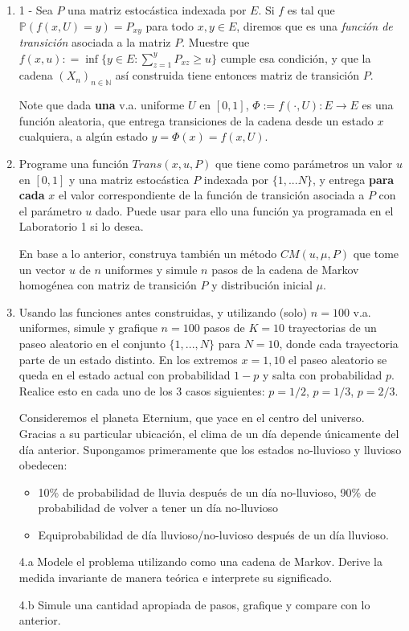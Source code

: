 \begin{enumerate}
    \item  1 - Sea $P$ una matriz estocástica  indexada por $E$. Si	$f$ es tal que $ \mathbb{P}(f(x,U)=y)= P_{xy} $ para todo $x,y\in E$, diremos que es una  \textit{función de transición} asociada a la matriz $P$. Muestre que $f(x,u): = \inf \{y\in E : \sum_{z=1}^y P_{xz}\geq u\}$ cumple esa condición, y que   la cadena $(X_n)_{n\in\mathbb{N}}$  así  construida tiene entonces matriz de transición $P$.

    Note que dada \textbf{una} v.a. uniforme $U$ en $[0,1]$, $\Phi:= f(\cdot,  U):E \rightarrow E$  es una función aleatoria,  que entrega transiciones de la cadena desde  un estado $x$ cualquiera, a algún estado $y=\Phi(x)= f(x,  U)$.  
				
    \item  Programe una función $Trans(x,u,P)$ que tiene  como parámetros un valor $u$  en $[0,1]$ y una matriz estocástica $P$ indexada por $\{1,...N\}$, y  entrega \textbf{para cada} $x$ el  valor correspondiente de la función de transición  asociada a $P$ con el parámetro $u$ dado.  Puede usar para ello una función ya programada en el Laboratorio 1 si lo desea.

    En base a lo anterior, construya  también  un método $CM(u,\mu,P)$ que tome un vector $u$ de $n$ uniformes y simule $n$ pasos de la cadena de Markov homogénea con matriz de transición $P$ y distribución inicial $\mu$. 

    \item Usando las funciones antes construidas, y utilizando (solo)  $n=100$ v.a. uniformes,   simule y grafique $n=100$ pasos de  $K=10$ trayectorias de un paseo aleatorio en el conjunto $\{1,...,N\}$ para $N=10$, donde cada trayectoria parte de  un estado distinto. En los extremos $x=1,10$ el paseo aleatorio se queda en el estado actual con probabilidad $1-p$ y salta con probabilidad $p$.  Realice esto  en cada uno de  los 3 casos siguientes: 	 $p=1/2$, $p=1/3$, $p= 2/3$.

    Consideremos el planeta Eternium, que yace en el centro del universo. Gracias a su particular ubicación, el clima de un día depende únicamente del día anterior. Supongamos primeramente que los estados no-lluvioso y lluvioso obedecen:
    \begin{itemize}
    \item 10\% de probabilidad de lluvia después de un día no-lluvioso, 90\% de probabilidad de volver a tener un día no-lluvioso
    \item  Equiprobabilidad de día lluvioso/no-luvioso después de un día lluvioso.
    \end{itemize}
    \item[4.a] Modele el problema utilizando como una cadena de Markov. Derive la medida invariante de manera teórica e interprete su significado.
    \item[4.b] Simule una cantidad apropiada de pasos, grafique y compare con lo anterior.


\end{enumerate}
